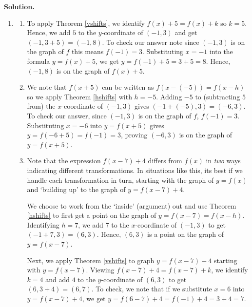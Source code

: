 \documentclass{ximera}
\begin{document}
\begin{example}
\begin{enumerate}
 

 
 \end{enumerate}
 
 \newpage
 
 {\bf Solution.}
 
 \begin{enumerate}
 
 \item 
  
 \begin{enumerate}  
 
 \item To apply Theorem \ref{vshifts}, we identify $f(x)+5 = f(x)+k$  so $k = 5$.  Hence, we add $5$ to the $y$-coordinate of $(-1,3)$  and get  $(-1,3+5) = (-1,8)$.  To check our answer note since $(-1,3)$ is on the graph of $f$ this means $f(-1) = 3$.  Substituting  $x=-1$ into the formula $y = f(x)+5$, we get $y = f(-1)+5 = 3+5 = 8$.  Hence, $(-1,8)$ is on the graph of $f(x)+5$.
 
 \item We note that $f(x+5)$ can be written as $f(x-(-5)) = f(x-h)$ so we apply Theorem \ref{hshifts} with $h=-5$.  Adding $-5$ to (subtracting $5$ from) the $x$-coordinate of  $(-1,3)$ gives $(-1+(-5), 3) = (-6,3)$.  To check our answer,  since $(-1,3)$ is on the graph of $f$, $f(-1) = 3$.  Substituting $x=-6$ into $y=f(x+5)$ gives $y=f(-6+5)=f(-1)=3$, proving $(-6,3)$ is on the graph of $y=f(x+5)$.
 
 \item Note that the expression $f(x-7)+4$ differs from $f(x)$ in \textit{two} ways indicating  different transformations. In situations like this, its best if we handle each transformation in turn, starting with the graph of  $y=f(x)$ and `building up' to the graph of $y = f(x-7)+4$.  
 
 \smallskip
 
 We choose to work from the `inside' (argument) out and use Theorem \ref{hshifts} to first get a point on the graph of $y=f(x-7) = f(x-h)$. Identifying $h=7$, we add $7$ to the $x$-coordinate of $(-1,3)$ to get $(-1+7,3) = (6,3)$.  Hence, $(6,3)$ is a point on the graph of $y = f(x-7)$.  
 
 \smallskip
 
 Next, we apply Theorem \ref{vshifts} to graph $y = f(x-7)+4$ starting with $y=f(x-7)$.  Viewing $f(x-7)+4 = f(x-7)+k$, we identify $k=4$ and add  $4$ to the $y$-coordinate of $(6,3)$ to get $(6,3+4) = (6,7)$.  To check, we note that if we substitute $x=6$ into $y = f(x-7)+4$, we get $y=f(6-7)+4 = f(-1)+4 = 3+4 =7$.
 

\end{enumerate}
\end{enumerate}
\end{example}
\end{document}
